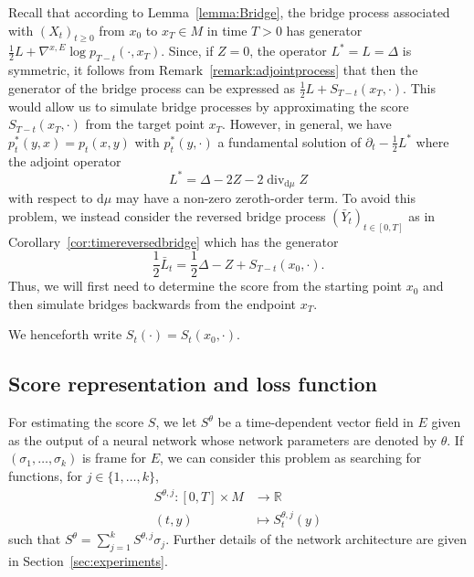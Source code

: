 \documentclass[10pt]{amsart}
\theoremstyle{remark}
\DeclareMathOperator{\dv}{div}
\newcommand{\db}{{\mathrm d}}
\numberwithin{equation}{section}
\begin{document}
Recall that according to Lemma~\ref{lemma:Bridge}, the bridge process associated with $(X_t)_{t\geq 0}$ from $x_0$ to $x_T\in M$ in time $T>0$ has generator $\frac{1}{2} L + \nabla^{x,E} \log p_{T-t}(\cdot , x_T)$. Since, if $Z = 0$, the operator $L^* = L = \Delta$ is symmetric, it follows from Remark~\ref{remark:adjointprocess} that then the generator of the bridge process can be expressed as $\frac{1}{2}L + S_{T-t}(x_T, \cdot)$. This would allow us to simulate bridge processes by approximating the score $S_{T-t}(x_T, \cdot)$ from the target point $x_T$.
However, in general, we have $p_t^*(y,x) = p_t(x,y)$ with $p_t^*(y,\cdot)$ a fundamental solution of $\partial_t - \frac{1}{2}L^*$ where the adjoint operator
\begin{displaymath}
    L^* = \Delta - 2Z - 2\dv_{\db\mu} Z
\end{displaymath}
with respect to $\db\mu$ may have a non-zero zeroth-order term. To avoid this problem, we instead consider the reversed bridge process $(\bar{Y}_t)_{t\in[0,T]}$ as in Corollary~\ref{cor:timereversedbridge} which has the generator
$$\frac{1}{2} \bar{L}_{t} = \frac{1}{2} \Delta-Z + S_{T-t}(x_0, \cdot ).$$
Thus, we will first need to determine the score from the starting point $x_0$ and then simulate bridges backwards from the endpoint $x_T$.

We henceforth write $S_{t}(\cdot) = S_t(x_0, \cdot)$.

\subsection{Score representation and loss function}
For estimating the score $S$, we let $S^\theta$ be a time-dependent vector field in $E$ given as the output of a neural network whose network parameters are denoted by $\theta$. If $(\sigma_1, \dots, \sigma_k)$ is frame for $E$, we can consider this problem as searching for functions, for $j\in\{1,\dots,k\}$,
\begin{align*}
    S^{\theta,j}\colon[0,T]\times M&\to\mathbb{R}\\
    (t,y) &\mapsto S_t^{\theta,j}(y)
\end{align*}
such that $S^{\theta} = \sum_{j=1}^k S^{\theta,j} \sigma_j$. Further details of the network architecture are given in Section~\ref{sec:experiments}.
\end{document}
